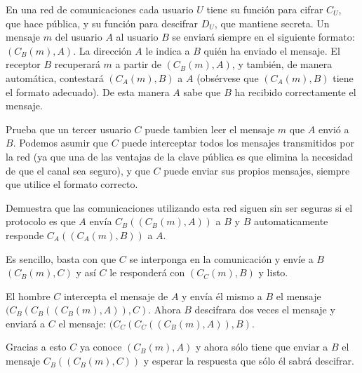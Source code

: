 \begin{problem}[2]
En una red de comunicaciones cada usuario $U$ tiene
su función para cifrar $C_U$, que hace pública, y su función para
descifrar $D_U$, que mantiene secreta. Un mensaje $m$ del usuario
$A$ al usuario $B$ se enviará siempre en el siguiente formato:
$(C_B(m),A)$. La dirección $A$ le indica a $B$ quién ha enviado el
mensaje. El receptor $B$ recuperará $m$ a partir de $(C_B(m),A)$,
y también, de manera automática, contestará  $(C_A(m),B)$ a $A$
(obsérvese que $(C_A(m),B)$ tiene el formato adecuado). De esta
manera $A$ sabe que $B$ ha recibido correctamente el mensaje.

\ppart Prueba que un tercer usuario $C$ puede tambien leer el mensaje
$m$ que $A$ envió a $B$. Podemos asumir que $C$ puede interceptar
todos los mensajes transmitidos por la red (ya que una de las
ventajas de la clave pública es que elimina la necesidad de que el
canal sea seguro), y que $C$ puede enviar sus propios mensajes,
siempre que utilice el formato correcto.

\ppart Demuestra que las comunicaciones utilizando esta red siguen sin
ser seguras si el protocolo es que $A$ envía $C_B((C_B(m),A))$ a
$B$ y $B$ automaticamente responde  $C_A((C_A(m),B))$ a $A$.
\solution


\spart

Es sencillo, basta con que $C$ se interponga en la comunicación y envíe a $B$ $(C_B(m),C)$ y así $C$ le responderá con $(C_C(m),B)$ y listo.

\spart

El hombre $C$ intercepta el mensaje de $A$ y envía él mismo a $B$ el mensaje $(C_B(C_B((C_B(m),A)),C)$. Ahora $B$ descifrara dos veces el mensaje y enviará a $C$ el mensaje: $(C_C(C_C((C_B(m),A)),B)$.

Gracias a esto $C$ ya conoce $(C_B(m),A)$ y ahora sólo tiene que enviar a $B$ el mensaje $C_B((C_B(m),C))$ y esperar la respuesta que sólo él sabrá descifrar.
\end{problem}

